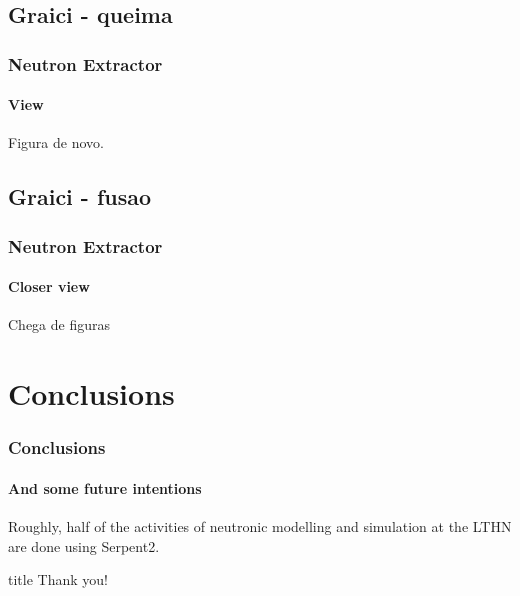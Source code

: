 \documentclass[svgnames,smaller,table]{beamer}
\begin{document}
\subsection{Graici - queima}
\begin{frame}
  \frametitle{Neutron Extractor}
  \framesubtitle{View}
  \begin{center}
    Figura de novo.
  \end{center}
\end{frame}

\subsection{Graici - fusao}
\begin{frame}
  \frametitle{Neutron Extractor}
  \framesubtitle{Closer view}
  \begin{center}
    Chega de figuras
  \end{center}
\end{frame}


\section{Conclusions}
\begin{frame}
  \frametitle{Conclusions}
  \framesubtitle{And some future intentions}
  Roughly, half of the activities of neutronic modelling and simulation at the LTHN are done using Serpent2.
\end{frame}



\begin{frame}
 \vfill
  \begin{beamercolorbox}[center]{title}
     \Huge{Thank you!}
  \end{beamercolorbox}
  \vfill
\end{frame}
\end{document}
